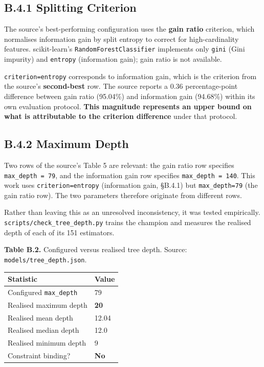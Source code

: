 \hypertarget{b.4.1-splitting-criterion}{%
\subsection{B.4.1 Splitting Criterion}\label{b.4.1-splitting-criterion}}

The source's best-performing configuration uses the \textbf{gain ratio} criterion, which normalises information gain by split entropy to correct for high-cardinality features. scikit-learn's \texttt{RandomForestClassifier} implements only \texttt{\textquotesingle{}gini\textquotesingle{}} (Gini impurity) and \texttt{\textquotesingle{}entropy\textquotesingle{}} (information gain); gain ratio is not available.

\texttt{criterion=\textquotesingle{}entropy\textquotesingle{}} corresponds to information gain, which is the criterion from the source's \textbf{second-best} row. The source reports a 0.36 percentage-point difference between gain ratio (95.04\%) and information gain (94.68\%) within its own evaluation protocol. \textbf{This magnitude represents an upper bound on what is attributable to the criterion difference} under that protocol.

\hypertarget{b.4.2-maximum-depth}{%
\subsection{B.4.2 Maximum Depth}\label{b.4.2-maximum-depth}}

Two rows of the source's Table 5 are relevant: the gain ratio row specifies \texttt{max\_depth\ =\ 79}, and the information gain row specifies \texttt{max\_depth\ =\ 140}. This work uses \texttt{criterion=\textquotesingle{}entropy\textquotesingle{}} (information gain, §B.4.1) but \texttt{max\_depth=79} (the gain ratio row). The two parameters therefore originate from different rows.

Rather than leaving this as an unresolved inconsistency, it was tested empirically. \texttt{scripts/check\_tree\_depth.py} trains the champion and measures the realised depth of each of its 151 estimators.

\textbf{Table B.2.} Configured versus realised tree depth. Source: \texttt{models/tree\_depth.json}.

\begin{longtable}[]{@{}ll@{}}
\toprule\noalign{}
Statistic & Value \\
\midrule\noalign{}
\endhead
\bottomrule\noalign{}
\endlastfoot
Configured \texttt{max\_depth} & 79 \\
Realised maximum depth & \textbf{20} \\
Realised mean depth & 12.04 \\
Realised median depth & 12.0 \\
Realised minimum depth & 9 \\
Constraint binding? & \textbf{No} \\
\end{longtable}

